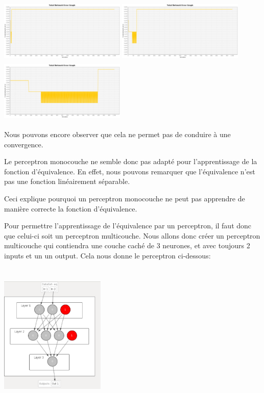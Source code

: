 \documentclass[twoside,openright,a4paper,11pt,french]{article}
\begin{document}
\includegraphics[width=6cm,height=3cm]{./pics/eq/mono_eq_0.1.eps}
\includegraphics[width=6cm,height=3cm]{./pics/eq/mono_eq_0.01.eps}
\includegraphics[width=6cm,height=3cm]{./pics/eq/mono_eq_0.001.eps}

Nous pouvons encore observer que cela ne permet pas de conduire à une convergence.

Le perceptron monocouche ne semble donc pas adapté pour l'apprentissage de la fonction
d'équivalence. En effet, nous pouvons remarquer que l'équivalence n'est pas une fonction
linéairement séparable.


Ceci explique pourquoi un perceptron monocouche ne peut pas apprendre de manière correcte
la fonction d'équivalence.

Pour permettre l'apprentissage de l'équivalence par un perceptron, il faut donc que
celui-ci soit un perceptron multicouche.
Nous allons donc créer un perceptron multicouche qui contiendra une couche caché de
3 neurones, et avec toujours 2 inputs et un un output.
Cela nous donne le perceptron ci-dessous:

\includegraphics[width=5cm,height=7cm]{./pics/eq/perceptron_multi.eps}
\end{document}
